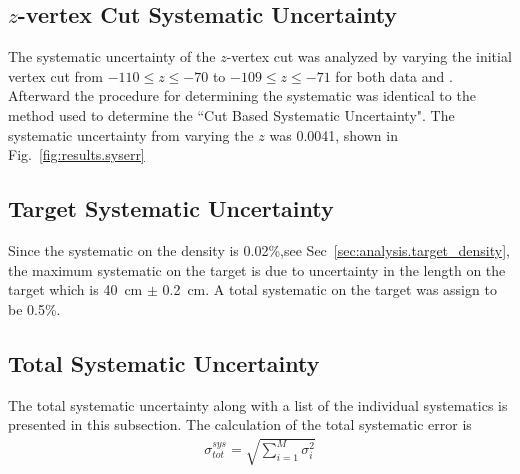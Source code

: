 					
 					\subsection{$z$-vertex Cut Systematic Uncertainty}
 					The systematic uncertainty of the $z$-vertex cut was analyzed by varying the initial vertex cut from $-110 \le z \le -70$ to $-109 \le z \le -71$ for both data and . Afterward the procedure for determining the systematic was identical to the method used to determine the ``Cut Based Systematic Uncertainty". The systematic uncertainty from varying the $z$ was 0.0041, shown in Fig.~\ref{fig:results.syserr}
 					
 					\subsection{Target Systematic Uncertainty}
 					Since the systematic on the density is 0.02\%,see Sec~\ref{sec:analysis.target_density}, the maximum systematic on the target is due to uncertainty in the length on the target which is 40~cm $\pm$ 0.2~cm. A total systematic on the target was assign to be 0.5\%. 
 					
 					\subsection{Total Systematic Uncertainty}
 					The total systematic uncertainty along with a list of the individual systematics is presented in this subsection. The calculation of the total systematic error is 
 					\begin{align}
 						\sigma^{sys}_{tot} = \sqrt{\sum_{i=1}^{M}\sigma_i^2}
 					\end{align}
 					
